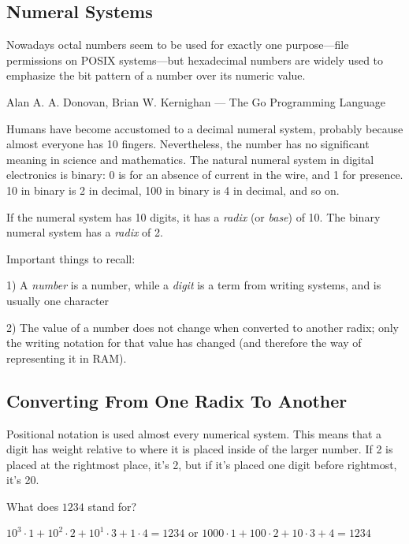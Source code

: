 \subsection{Numeral Systems}

\epigraph{Nowadays octal numbers seem to be
used for exactly one purpose---file permissions on POSIX systems---but hexadecimal numbers
are widely used to emphasize the bit pattern of a number over its numeric value.}
{Alan A. A. Donovan, Brian W. Kernighan ---  The Go Programming Language}

Humans have become accustomed to a decimal numeral system, probably because almost everyone has 10 fingers.
Nevertheless, the number  has no significant meaning in science and mathematics.
The natural numeral system in digital electronics is binary: 0 is for an absence of current in the wire, and 1 for presence.
10 in binary is 2 in decimal, 100 in binary is 4 in decimal, and so on.

If the numeral system has 10 digits, it has a \emph{radix} (or \emph{base}) of 10.
The binary numeral system has a \emph{radix} of 2.

Important things to recall:

1) A \emph{number} is a number, while a \emph{digit} is a term from writing systems, and is usually one character

2) The value of a number does not change when converted to another radix; only the writing notation for that value has changed (and therefore the way of representing it in \ac{RAM}).

\subsection{Converting From One Radix To Another}

Positional notation is used almost every numerical system. This means that a digit has weight relative to where it is placed inside of the larger number.
If 2 is placed at the rightmost place, it's 2, but if it's placed one digit before rightmost, it's 20.

What does $1234$ stand for?

$10^3 \cdot 1 + 10^2 \cdot 2 + 10^1 \cdot 3 + 1 \cdot 4 = 1234$ or
$1000 \cdot 1 + 100 \cdot 2 + 10 \cdot 3 + 4 = 1234$

